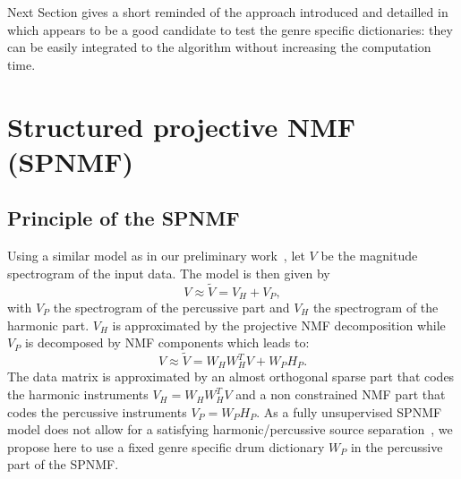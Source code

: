 \documentclass{article}
\begin{document}

Next Section gives a short reminded of the approach introduced and detailled in~\cite{laroche2015structuredhidden,larocheJournalhidden} which appears to be a good candidate to test the genre specific dictionaries: they can be easily integrated to the algorithm without increasing the computation time. %



\section{Structured projective NMF (SPNMF)}
\label{sec:SPNMF}



\subsection{Principle of the SPNMF}

Using a similar model as in our preliminary work~\cite{laroche2015structuredhidden}, let $V$ be the magnitude spectrogram of the input data. The model is then given by
\begin{equation} \label{Cfunction}
V \approx \tilde{V}= V_H + V_{P},
\end{equation}
with $V_P$ the spectrogram of the percussive part and $V_H$ the spectrogram of the harmonic part. $V_H$ is approximated by the projective NMF decomposition \cite{yuanOja2005} while $V_P$ is decomposed by NMF components which leads to:
\begin{equation}
V \approx \tilde{V}= W_{H}W_{H}^{T}V + W_{P} H_{P}.
\end{equation}
The data matrix is approximated by an almost orthogonal sparse part that codes the harmonic instruments $V_H = W_HW_H^T V$ and a non constrained NMF part that codes the percussive instruments $V_P = W_PH_P$. As a fully unsupervised SPNMF model does not allow for a satisfying harmonic/percussive source separation~\cite{laroche2015structuredhidden}, we propose here to use a fixed genre specific drum dictionary $W_P$ in the percussive part of the SPNMF.
\end{document}
